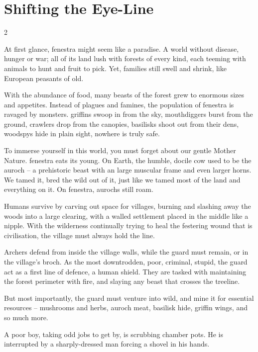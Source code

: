 \section*{Shifting the Eye-Line}

\begin{multicols}{2}

\noindent
At first glance, \gls{fenestra} might seem like a paradise.
A world without disease, hunger or war; all of its land lush with forests of every kind, each teeming with animals to hunt and fruit to pick.
Yet, families still swell and shrink, like European peasants of old.

With the abundance of food, many beasts of the forest grew to enormous sizes and appetites.
Instead of plagues and famines, the population of \gls{fenestra} is ravaged by \glspl{monster}.
\Glspl{griffin} swoop in from the sky, mouthdiggers burst from the ground, \glspl{crawler} drop from the canopies, \glspl{basilisk} shoot out from their dens, \glspl{woodspy} hide in plain sight, nowhere is truly safe.

To immerse yourself in this world, you must forget about our gentle Mother Nature.
\Gls{fenestra} eats its young.
On Earth, the humble, docile cow used to be the auroch -- a prehistoric beast with an large muscular frame and even larger horns.
We tamed it, bred the wild out of it, just like we tamed most of the land and everything on it.
On \gls{fenestra}, aurochs still roam.

Humans survive by carving out space for \glspl{village}, burning and slashing away the woods into a large clearing, with a walled settlement placed in the middle like a nipple.
With the wilderness continually trying to heal the festering wound that is civilisation, the \gls{village} must always hold the line.

Archers defend from inside the \gls{village} walls, while the \gls{guard} must remain, or in the \gls{village}'s \gls{broch}.
As the most downtrodden, poor, criminal, stupid, the \gls{guard} act as a first line of defence, a human shield.
They are tasked with maintaining the forest perimeter with fire, and slaying any beast that crosses the treeline.

But most importantly, the \gls{guard} must venture into wild, and mine it for essential resources -- mushrooms and herbs, auroch meat, \gls{basilisk} hide, \gls{griffin} wings, and so much more.

\begin{exampletext}
  A poor boy, taking odd jobs to get by, is scrubbing chamber pots.
  He is interrupted by a sharply-dressed man forcing a shovel in his hands.


\end{exampletext}
\end{multicols}
